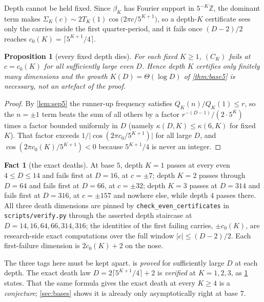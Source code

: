 \documentclass[11pt]{amsart}
\newtheorem{proposition}[theorem]{Proposition}
\theoremstyle{definition}
\newtheorem{fact}[theorem]{Fact}
\theoremstyle{remark}
\begin{document}
Depth cannot be held fixed. Since $\beta_K$ has Fourier support in $5^{-K}\mathbb Z$, the dominant term makes $\Sigma_K(c) \sim 2T_K(1)\cos\bigl(2\pi c/5^{K+1}\bigr)$, so a depth-$K$ certificate sees only the carries inside the first quarter-period, and it fails once $(D-2)/2$ reaches $c_0(K) = \lceil 5^{K+1}/4\rceil$.

\begin{proposition}[every fixed depth dies]
\label{prop:death5}
For each fixed $K \ge 1$, $(C_K)$ fails at $c = c_0(K)$ for all sufficiently large even $D$. Hence depth $K$ certifies only finitely many dimensions and the growth $K(D) = \Theta(\log D)$ of \cref{thm:base5} is necessary, not an artefact of the proof.
\end{proposition}

\begin{proof}
By \cref{lem:sep5} the runner-up frequency satisfies $Q_K(n)/Q_K(1) \le r$, so the $n = \pm1$ term beats the sum of all others by a factor $r^{-(D-1)}/(2\cdot 5^K)$ times a factor bounded uniformly in $D$ (namely $\kappa(D,K) \le \kappa(6,K)$ for fixed $K$). That factor exceeds $1/\lvert\cos(2\pi c_0/5^{K+1})\rvert$ for all large $D$, and $\cos(2\pi c_0(K)/5^{K+1}) < 0$ because $5^{K+1}/4$ is never an integer.
\end{proof}

\begin{fact}[the exact deaths]
\label{fact:death5}
At base $5$, depth $K = 1$ passes at every even $4 \le D \le 14$ and fails first at $D = 16$, at $c = \pm 7$; depth $K = 2$ passes through $D = 64$ and fails first at $D = 66$, at $c = \pm 32$; depth $K = 3$ passes at $D = 314$ and fails first at $D = 316$, at $c = \pm 157$ and nowhere else, while depth $4$ passes there. All three death dimensions are pinned by \texttt{check\_even\_certificates} in \texttt{scripts/verify.py} through the asserted depth staircase at $D = 14, 16, 64, 66, 314, 316$; the identities of the first failing carries, $\pm c_0(K)$, are research-side exact computations over the full window $\lvert c\rvert \le (D-2)/2$. Each first-failure dimension is $2c_0(K)+2$ on the nose.
\end{fact}

The three tags here must be kept apart.  is \emph{proved} for sufficiently large $D$ at each depth. The exact death law $D = 2\lceil 5^{K+1}/4\rceil + 2$ is \emph{verified} at $K = 1, 2, 3$, as \cref{fact:death5} states. That the same formula gives the exact death at every $K \ge 4$ is a \emph{conjecture}; \cref{sec:bases} shows it is already only asymptotically right at base $7$.
\end{document}
